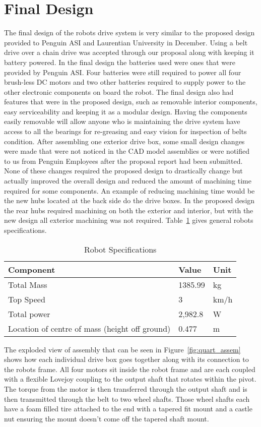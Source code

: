 \section{Final Design}
The final design of the robots drive system is very similar to the proposed design provided to Penguin ASI and Laurentian University in December. Using a belt drive over a chain drive was accepted through our proposal along with keeping it battery powered. In the final design the batteries used were ones that were provided by Penguin ASI. Four batteries were still required to power all four brush-less DC motors and two other batteries required to supply power to the other electronic components on board the robot. The final design also had features that were in the proposed design, such as removable interior components, easy serviceability and keeping it as a modular design. Having the components easily removable will allow anyone who is maintaining the drive system have access to all the bearings for re-greasing and easy vision for inspection of belts condition.  After assembling one exterior drive box, some small design changes were made that were not noticed in the CAD model assemblies or were notified to us from Penguin Employees after the proposal report had been submitted. None of these changes required the proposed design to drastically change but actually improved the overall design and reduced the amount of machining time required for some components. An example of reducing machining time would be the new hubs located at the back side do the drive boxes. In the proposed design the rear hubs required machining on both the exterior and interior, but with the new design all exterior machining was not required. Table~\ref{tab:specs} gives general robots specifications.

\begin{table}[htbp]
\centering
\caption{Robot Specifications}
\begin{tabular}{| p{5cm}ll |} \hline
Component & Value & Unit \\ \hline
Total Mass & 1385.99 & kg \\
Top Speed & 3	& km/h \\
Total power & 2,982.8 & W \\
Location of centre of mass (height off ground) & 0.477 & m\\ \hline
 \end{tabular}
 \label{tab:specs}
 \end{table}

The exploded view of assembly that can be seen in Figure~\ref{fig:quart_assem} shows how each individual drive box goes together along with its connection to the robots frame. All four motors sit inside the robot frame and are each coupled with a flexible Lovejoy coupling to the output shaft that rotates within the pivot. The torque from the motor is then transferred through the output shaft and is then transmitted through the belt to two wheel shafts. Those wheel shafts each have a foam filled tire attached to the end with a tapered fit mount and a castle nut ensuring the mount doesn't come off the tapered shaft mount.


